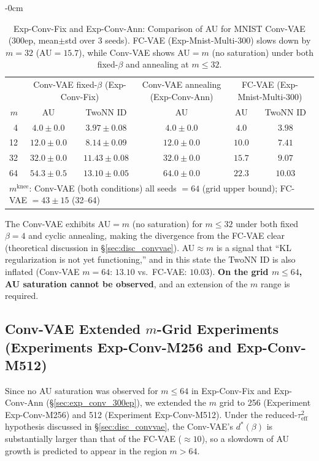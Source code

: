 \documentclass[make,article,submit,pdftex,moreauthors]{Definitions/mdpi}
\newcommand{\mknee}{m^{\mathrm{knee}}}
\begin{document}
\begin{table}[H]
\begin{adjustwidth}{-\extralength}{0cm}
\centering
\caption{Exp-Conv-Fix and Exp-Conv-Ann: Comparison of AU for MNIST Conv-VAE (300ep, mean$\pm$std over 3 seeds). FC-VAE (Exp-Mnist-Multi-300) slows down by $m=32$ (AU$=15.7$), while Conv-VAE shows AU$=m$ (no saturation) under both fixed-$\beta$ and annealing at $m \leq 32$.}
\label{tab:eh_conv_vae}
\small
\begin{tabular}{r ccc cc}
\toprule
 & \multicolumn{2}{c}{Conv-VAE fixed-$\beta$ (Exp-Conv-Fix)} & \multicolumn{1}{c}{Conv-VAE annealing (Exp-Conv-Ann)} & \multicolumn{2}{c}{FC-VAE (Exp-Mnist-Multi-300)} \\
$m$ & AU & TwoNN ID & AU & AU & TwoNN ID \\
\midrule
 4 & $4.0\pm0.0$ & $3.97\pm0.08$ & $4.0\pm0.0$ & $4.0$ & $3.98$ \\
12 & $12.0\pm0.0$ & $8.14\pm0.09$ & $12.0\pm0.0$ & $10.0$ & $7.41$ \\
32 & $32.0\pm0.0$ & $11.43\pm0.08$ & $32.0\pm0.0$ & $15.7$ & $9.07$ \\
64 & $54.3\pm0.5$ & $13.10\pm0.05$ & $64.0\pm0.0$ & $22.3$ & $10.03$ \\
\midrule
\multicolumn{6}{l}{$\mknee$: Conv-VAE (both conditions) all seeds $=64$ (grid upper bound); FC-VAE $=43\pm15$ (32--64)} \\
\bottomrule
\end{tabular}
\end{adjustwidth}
\end{table}

The Conv-VAE exhibits AU$=m$ (no saturation) for $m \leq 32$ under both fixed $\beta=4$ and cyclic annealing,
making the divergence from the FC-VAE clear (theoretical discussion in \S\ref{sec:disc_convvae}).
AU$\approx m$ is a signal that ``KL regularization is not yet functioning,'' and in this state the TwoNN ID
is also inflated (Conv-VAE $m=64$: $13.10$ vs.\ FC-VAE: $10.03$).
\textbf{On the grid $m \leq 64$, AU saturation cannot be observed}, and an extension of the $m$ range is required.

\subsection{Conv-VAE Extended $m$-Grid Experiments (Experiments Exp-Conv-M256 and Exp-Conv-M512)}\label{sec:exp_en}

Since no AU saturation was observed for $m \leq 64$ in Exp-Conv-Fix and Exp-Conv-Ann (\S\ref{sec:exp_conv_300ep}),
we extended the $m$ grid to 256 (Experiment Exp-Conv-M256) and 512 (Experiment Exp-Conv-M512).
Under the reduced-$\tau^2_\mathrm{eff}$ hypothesis discussed in \S\ref{sec:disc_convvae},
the Conv-VAE's $d^*(\beta)$ is substantially larger than that of the FC-VAE ($\approx 10$),
so a slowdown of AU growth is predicted to appear in the region $m>64$.
\end{document}
